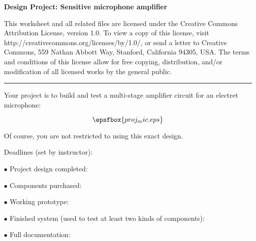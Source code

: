 
\centerline{\bf Design Project: Sensitive microphone amplifier} \bigskip 
 
This worksheet and all related files are licensed under the Creative Commons Attribution License, version 1.0.  To view a copy of this license, visit http://creativecommons.org/licenses/by/1.0/, or send a letter to Creative Commons, 559 Nathan Abbott Way, Stanford, California 94305, USA.  The terms and conditions of this license allow for free copying, distribution, and/or modification of all licensed works by the general public.

\bigskip 

\hrule

\vskip 10pt

Your project is to build and test a multi-stage amplifier circuit for an electret microphone:

$$\epsfbox{proj_mic.eps}$$

Of course, you are not restricted to using this exact design.

\vskip 10pt

\noindent
Deadlines (set by instructor):

\medskip
\item{$\bullet$} Project design completed: 
\item{$\bullet$} Components purchased:
\item{$\bullet$} Working prototype:
\item{$\bullet$} Finished system (used to test at least two kinds of components):
\item{$\bullet$} Full documentation:
\medskip



